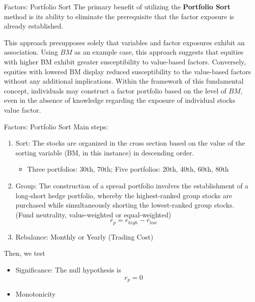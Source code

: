 \documentclass{beamer}
\begin{document}
\begin{frame}{Factors: Portfolio Sort}
	The primary benefit of utilizing the \textbf{Portfolio Sort} method is its ability to eliminate the prerequisite that the factor exposure is already established.

	This approach presupposes solely that variables and factor exposures exhibit an association. Using $BM$ as an example case, this approach suggests that equities with higher BM exhibit greater susceptibility to value-based factors. Conversely, equities with lowered BM display reduced susceptibility to the value-based factors without any additional implications. Within the framework of this fundamental concept, individuals may construct a factor portfolio based on the level of $BM$, even in the absence of knowledge regarding the exposure of individual stocks value factor.
\end{frame}

\begin{frame}[allowframebreaks]{Factors: Portfolio Sort}
Main steps:
\begin{enumerate}
	\item Sort: The stocks are organized in the cross section based on the value of the sorting variable (BM, in this instance) in descending order.
	\begin{itemize}
		\item Three portfolios: 30th, 70th; Five portfolios: 20th, 40th, 60th, 80th
	\end{itemize}
	\item Group: The construction of a spread portfolio involves the establishment of a long-short hedge portfolio, whereby the highest-ranked group stocks are purchased while simultaneously shorting the lowest-ranked group stocks. (Fund neutrality, value-weighted or equal-weighted)
	\begin{equation}
	r_p = r_{high} - r_{low}
	\end{equation}
	\item Rebalance: Monthly or Yearly (Trading Cost)
\end{enumerate}
Then, we test
\begin{itemize}
	\item Significance: The null hypothesis is
\begin{equation*}
	r_p = 0
\end{equation*}
	\item Monotonicity
\end{itemize}
\end{frame}
\end{document}
